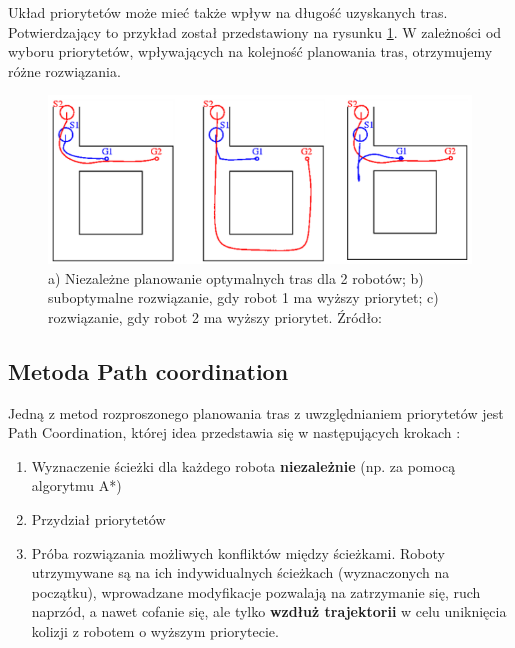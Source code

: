 Układ priorytetów może mieć także wpływ na długość uzyskanych tras. Potwierdzający to przykład został przedstawiony na rysunku \ref{fig:image_article1_ppt6}. W zależności od wyboru priorytetów, wpływających na kolejność planowania tras, otrzymujemy różne rozwiązania.
\begin{figure}
	\centering
	\includegraphics[width=13cm]{img/article1/ppt6}
	\caption{a) Niezależne planowanie optymalnych tras dla 2 robotów; b) suboptymalne rozwiązanie, gdy robot 1 ma wyższy priorytet; c) rozwiązanie, gdy robot 2 ma wyższy priorytet. Źródło: \cite{optpriorities}}
	\label{fig:image_article1_ppt6}
\end{figure}

\subsection{Metoda Path coordination}
Jedną z metod rozproszonego planowania tras z uwzględnianiem priorytetów jest Path Coordination, której idea przedstawia się w następujących krokach \cite{optpriorities}:
\begin{enumerate}
	\item Wyznaczenie ścieżki dla każdego robota {\bf niezależnie} (np. za pomocą algorytmu A*)
	\item Przydział priorytetów
	\item Próba rozwiązania możliwych konfliktów między ścieżkami. Roboty utrzymywane są na ich indywidualnych ścieżkach (wyznaczonych na początku), wprowadzane modyfikacje pozwalają na zatrzymanie się, ruch naprzód, a nawet cofanie się, ale tylko {\bf wzdłuż trajektorii} w celu uniknięcia kolizji z robotem o wyższym priorytecie.
\end{enumerate}